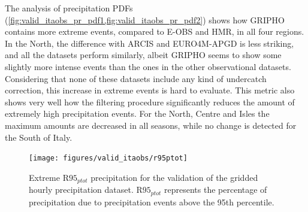The analysis of precipitation PDFs (\cref{fig:valid_itaobs_pr_pdf1,fig:valid_itaobs_pr_pdf2}) shows how GRIPHO contains more extreme events, compared to E-OBS and HMR, in all four regions. In the North, the difference with ARCIS and EURO4M-APGD is less striking, and all the datasets perform similarly, albeit GRIPHO seems to show some slightly more intense events than the ones in the other observational datasets.
Considering that none of these datasets include any kind of undercatch correction, this increase in extreme events is hard to evaluate.
This metric also shows very well how the filtering procedure significantly reduces the amount of extremely high precipitation events.
For the North, Centre and Isles the maximum amounts are decreased in all seasons, while no change is detected for the South of Italy.
\begin{figure}
    \centering
        \texttt{[image: figures/valid\_itaobs/r95ptot]}
    \decoRule
    \caption[GRIPHO validation: $\textrm{R95}_{ptot}$]{
        Extreme $\textrm{R95}_{ptot}$ precipitation for the validation of the gridded hourly precipitation dataset. $\textrm{R95}_{ptot}$ represents the percentage of precipitation due to precipitation events above the 95th percentile.
} \label{fig:valid_itaobs_pr_r95}
\end{figure}
